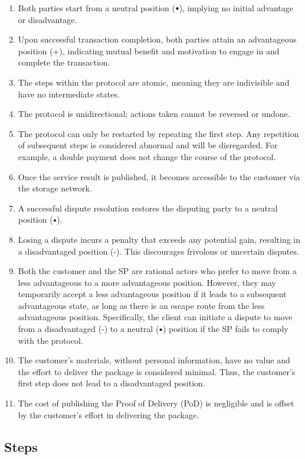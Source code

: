 \documentclass[pdftex,twocolumn,epjc3]{svjour3}
\newcommand{\plus}{+}
\newcommand{\minus}{-}
\newcommand\neutral[1][.75]{\mathbin{\ThisStyle{\vcenter{\hbox{%
  \scalebox{#1}{$\SavedStyle\bullet$}}}}}%
}
\begin{document}
{\begin{enumerate}
\item Both parties start from a neutral position ($\neutral{}$), implying no initial advantage or disadvantage.
\item Upon successful transaction completion, both parties attain an advantageous position (\plus{}), indicating mutual benefit and motivation to engage in and complete the transaction.
\item The steps within the protocol are atomic, meaning they are indivisible and have no intermediate states.
\item The protocol is unidirectional; actions taken cannot be reversed or undone.
\item The protocol can only be restarted by repeating the first step. Any repetition of subsequent steps is considered abnormal and will be disregarded. For example, a double payment does not change the course of the protocol.
\item Once the service result is published, it becomes accessible to the customer via the storage network.
\item A successful dispute resolution restores the disputing party to a neutral position ($\neutral{}$).
\item Losing a dispute incurs a penalty that exceeds any potential gain, resulting in a disadvantaged position (\minus{}). This discourages frivolous or uncertain disputes.
\item Both the customer and the SP are rational actors who prefer to move from a less advantageous to a more advantageous position. However, they may temporarily accept a less advantageous position if it leads to a subsequent advantageous state, as long as there is an escape route from the less advantageous position. Specifically, the client can initiate a dispute to move from a disadvantaged (\minus{}) to a neutral ($\neutral{}$) position if the SP fails to comply with the protocol.
\item The customer's materials, without personal information, have no value and the effort to deliver the package is considered minimal. Thus, the customer's first step does not lead to a disadvantaged position.
\item The cost of publishing the Proof of Delivery (PoD) is negligible and is offset by the customer's effort in delivering the package.
\end{enumerate}

\subsection{Steps}\label{sec:steps}

}
\end{document}
